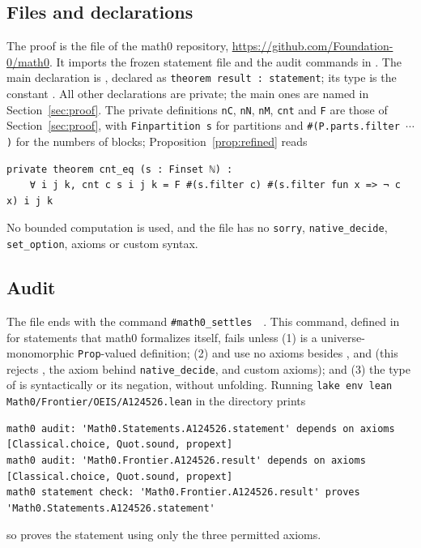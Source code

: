 \documentclass[11pt]{amsart}
\theoremstyle{plain}
\theoremstyle{definition}
\begin{document}
\subsection*{Files and declarations}
The proof is the file  of the math0 repository, \url{https://github.com/Foundation-0/math0}.
It imports the frozen statement file  and the audit commands in .
The main declaration is , declared as \texttt{theorem result : statement}; its type is the constant .
All other declarations are private; the main ones are named in Section~\ref{sec:proof}.
The private definitions \texttt{nC}, \texttt{nN}, \texttt{nM}, \texttt{cnt} and \texttt{F} are those of Section~\ref{sec:proof}, with \texttt{Finpartition s} for partitions and \texttt{\#(P.parts.filter $\cdots$)} for the numbers of blocks; Proposition~\ref{prop:refined} reads
\begin{lstlisting}
private theorem cnt_eq (s : Finset ℕ) :
    ∀ i j k, cnt c s i j k = F #(s.filter c) #(s.filter fun x => ¬ c x) i j k
\end{lstlisting}
No bounded computation is used, and the file has no \texttt{sorry}, \texttt{native\_decide}, \texttt{set\_option}, axioms or custom syntax.



\subsection*{Audit}
The file ends with the command \texttt{\#math0\_settles}~~.
This command, defined in  for statements that math0 formalizes itself, fails unless (1)  is a universe-monomorphic \texttt{Prop}-valued definition; (2)  and  use no axioms besides ,  and  (this rejects , the axiom  behind \texttt{native\_decide}, and custom axioms); and (3) the type of  is syntactically  or its negation, without unfolding.
Running \texttt{lake env lean Math0/Frontier/OEIS/A124526.lean} in the directory  prints\par\nobreak\noindent
\begin{minipage}{\linewidth}
\begin{lstlisting}[basicstyle=\ttfamily\scriptsize]
math0 audit: 'Math0.Statements.A124526.statement' depends on axioms [Classical.choice, Quot.sound, propext]
math0 audit: 'Math0.Frontier.A124526.result' depends on axioms [Classical.choice, Quot.sound, propext]
math0 statement check: 'Math0.Frontier.A124526.result' proves 'Math0.Statements.A124526.statement'
\end{lstlisting}
\end{minipage}
so  proves the statement using only the three permitted axioms.
\end{document}
